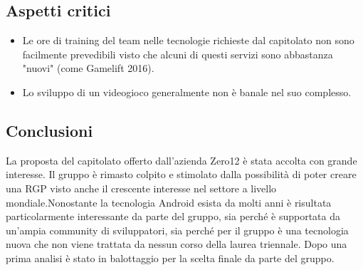 \subsection{Aspetti critici}
\begin{itemize}
\item Le ore di training del team nelle tecnologie richieste dal capitolato non sono facilmente prevedibili visto che alcuni di questi servizi sono abbastanza "nuovi" (come Gamelift 2016).
\item Lo sviluppo di un videogioco generalmente non è banale nel suo complesso.
\end{itemize}
\subsection{Conclusioni}
La proposta del capitolato offerto dall'azienda Zero12 è stata accolta con grande interesse. Il gruppo è rimasto colpito e stimolato dalla possibilità 
di poter creare una RGP visto anche il crescente interesse nel settore a livello mondiale.Nonostante la tecnologia Android esista da molti anni è risultata particolarmente 
interessante da parte del gruppo, sia perché è supportata da un'ampia community di sviluppatori, sia perché per il gruppo è una tecnologia nuova che non viene 
trattata da nessun corso della laurea triennale. Dopo una prima analisi è stato in balottaggio per la scelta finale da parte del gruppo.
